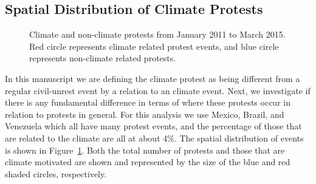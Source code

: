 \subsection{Spatial Distribution of Climate Protests}
\begin{figure}[t]
	\centering
	\caption{Climate and non-climate protests from January 2011 to March 2015. Red circle represents climate related protest events, and blue circle represents non-climate related protests. }
\label{climate-map}
\end{figure}

In this manuscript we are defining the climate protest as being different from a regular civil-unrest event by a relation to an climate event.
Next, we investigate if there is any fundamental difference in terms of where these protests occur in relation to protests in general.
For this analysis we use Mexico, Brazil, and Venezuela which all have many protest events, and the percentage of those that are related to the climate are all at about 4\%.
The spatial distribution of events is shown in  Figure~\ref{climate-map}.
Both the total number of protests and those that are climate motivated are shown and represented by the size of the blue and red shaded circles, respectively.

